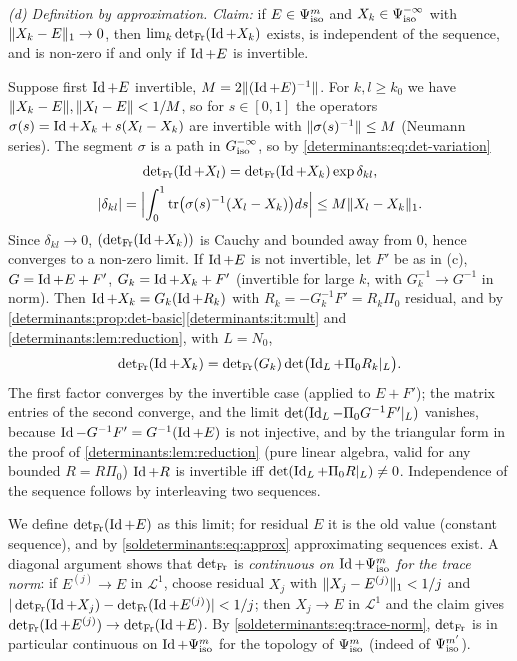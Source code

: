 \emph{(d) Definition by approximation.} \emph{Claim:} if $E\in\Psi^{m}_{\mathrm{iso}}$ and $X_k\in\Psi^{-\infty}_{\mathrm{iso}}$ with
$\lVert X_k-E\rVert_1\to0$, then $\lim_k\operatorname{det}_{\mathrm{Fr}}(\operatorname{Id}+X_k)$ exists, is independent of the sequence, and is
non-zero if and only if $\operatorname{Id}+E$ is invertible.

Suppose first $\operatorname{Id}+E$ invertible, $M=2\lVert (\operatorname{Id}+E)^{-1}\rVert$. For $k,l\ge k_0$ we have
$\lVert X_k-E\rVert,\lVert X_l-E\rVert<1/M$, so for $s\in[0,1]$ the operators $\sigma(s)=\operatorname{Id}+X_k+s(X_l-X_k)$ are
invertible with $\lVert \sigma(s)^{-1}\rVert\le M$ (Neumann series). The segment $\sigma$ is a path in
$G^{-\infty}_{\mathrm{iso}}$, so by \eqref{determinants:eq:det-variation}
\begin{gather*}
  \operatorname{det}_{\mathrm{Fr}}(\operatorname{Id}+X_l)=\operatorname{det}_{\mathrm{Fr}}(\operatorname{Id}+X_k)\exp\delta_{kl},\\
  |\delta_{kl}|=\Bigl|\int_0^1\operatorname{tr}\bigl(\sigma(s)^{-1}(X_l-X_k)\bigr)ds\Bigr|\le M\lVert X_l-X_k\rVert_1 .
\end{gather*}
Since $\delta_{kl}\to0$, $(\operatorname{det}_{\mathrm{Fr}}(\operatorname{Id}+X_k))$ is Cauchy and bounded away from $0$, hence converges to a
non-zero limit. If $\operatorname{Id}+E$ is not invertible, let $F'$ be as in (c), $G=\operatorname{Id}+E+F'$, $G_k=\operatorname{Id}+X_k+F'$
(invertible for large $k$, with $G_k^{-1}\to G^{-1}$ in norm). Then $\operatorname{Id}+X_k=G_k(\operatorname{Id}+R_k)$ with
$R_k=-G_k^{-1}F'=R_k\Pi_0$ residual, and by \cref{determinants:prop:det-basic}\ref{determinants:it:mult} and
\cref{determinants:lem:reduction}, with $L=N_0$,
\begin{equation*}
  \operatorname{det}_{\mathrm{Fr}}(\operatorname{Id}+X_k)=\operatorname{det}_{\mathrm{Fr}}(G_k)\det\bigl(\operatorname{Id}_L+\Pi_0R_k|_L\bigr).
\end{equation*}
The first factor converges by the invertible case (applied to $E+F'$); the matrix entries of the
second converge, and the limit $\det(\operatorname{Id}_L-\Pi_0G^{-1}F'|_L)$ vanishes, because $\operatorname{Id}-G^{-1}F'=G^{-1}(\operatorname{Id}+E)$
is not injective, and by the triangular form in the proof of \cref{determinants:lem:reduction} (pure
linear algebra, valid for any bounded $R=R\Pi_0$) $\operatorname{Id}+R$ is invertible iff $\det(\operatorname{Id}_L+\Pi_0R|_L)\neq0$.
Independence of the sequence follows by interleaving two sequences.

We define $\operatorname{det}_{\mathrm{Fr}}(\operatorname{Id}+E)$ as this limit; for residual $E$ it is the old value (constant sequence),
and by \eqref{soldeterminants:eq:approx} approximating sequences exist. A diagonal argument shows that
$\operatorname{det}_{\mathrm{Fr}}$ is \emph{continuous on $\operatorname{Id}+\Psi^{m}_{\mathrm{iso}}$ for the trace norm}: if $E^{(j)}\to E$ in $\mathcal L^1$,
choose residual $X_j$ with $\lVert X_j-E^{(j)}\rVert_1<1/j$ and $|\operatorname{det}_{\mathrm{Fr}}(\operatorname{Id}+X_j)-\operatorname{det}_{\mathrm{Fr}}(\operatorname{Id}+E^{(j)})|<1/j$;
then $X_j\to E$ in $\mathcal L^1$ and the claim gives $\operatorname{det}_{\mathrm{Fr}}(\operatorname{Id}+E^{(j)})\to\operatorname{det}_{\mathrm{Fr}}(\operatorname{Id}+E)$. By
\eqref{soldeterminants:eq:trace-norm}, $\operatorname{det}_{\mathrm{Fr}}$ is in particular continuous on $\operatorname{Id}+\Psi^{m}_{\mathrm{iso}}$ for the topology of
$\Psi^{m}_{\mathrm{iso}}$ (indeed of $\Psi^{m'}_{\mathrm{iso}}$).

